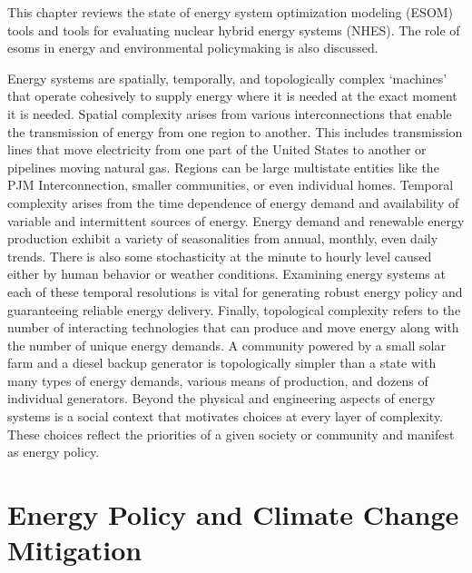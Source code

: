This chapter reviews the state of energy system optimization modeling (ESOM) tools
and tools for evaluating nuclear hybrid energy systems (NHES). The role of \glspl{esom}
in energy and environmental policymaking is also discussed.

Energy systems are spatially, temporally, and topologically complex ‘machines’
that operate cohesively to supply energy where it is needed at the exact moment
it is needed. Spatial complexity arises from various interconnections that enable
the transmission of energy from one region to another. This includes transmission
lines that move electricity from one part of the United States to another or
pipelines moving natural gas. Regions can be large multistate entities like the
PJM Interconnection, smaller communities, or even individual homes. Temporal
complexity arises from the time dependence of energy demand and availability of
variable and intermittent sources of energy. Energy demand and renewable energy
production
exhibit a variety of seasonalities from annual, monthly, even daily trends.
There is also some stochasticity at the minute to hourly level caused either by
human behavior or weather conditions.
Examining energy systems at each of these temporal resolutions is vital for
generating robust energy policy and guaranteeing reliable energy delivery. Finally,
topological complexity refers to the number of interacting technologies that can
produce and move energy along with the number of unique energy demands.
A community powered by a small solar farm and a diesel
backup generator is topologically simpler than a state with many types of energy
demands, various means of production, and dozens of individual generators. Beyond
the physical and engineering aspects of energy systems is a social context that
motivates choices at every layer of complexity. These choices reflect the priorities
of a given society or community and manifest as energy policy.

\section{Energy Policy and Climate Change Mitigation}

